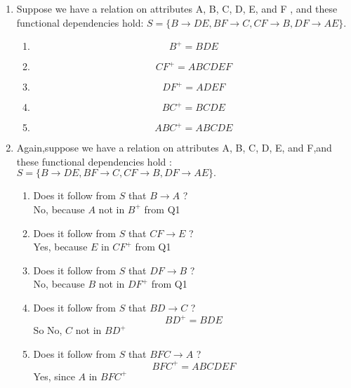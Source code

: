 \documentclass[11pt]{article}
\begin{document}
\begin{enumerate}
    \item Suppose we have a relation on attributes A, B, C, D, E, and F , and these functional dependencies hold: $S=\{B\to DE, BF \to C, CF \to B, DF \to AE\}$.
    \begin{solution}
        \begin{enumerate}
            \item 
            \[
                B^+ = BDE
            \]
            \item 
            \[
                CF^+ = ABCDEF
            \]
            \item 
            \[
                DF^+ = ADEF
            \]
            \item 
            \[
                BC^+ = BCDE
            \]
            \item 
            \[
                ABC^+ = ABCDE
            \]
        \end{enumerate}
    \end{solution}
    \item Again,suppose we have a relation on attributes A, B, C, D, E, and F,and these functional dependencies hold : $S = \{ B\to DE, BF \to C, CF\to B, DF\to AE \}.$
    \begin{solution}
        \begin{enumerate}
            \item Does it follow from $S$ that $B\to A$ ? \\
            No, because $A$ not in $B^+$ from Q1
            \item Does it follow from $S$ that $CF\to E$ ? \\ 
            Yes, because $E$ in $CF^+$ from Q1
            \item Does it follow from $S$ that $DF\to B$ ? \\
            No, because $B$ not in $DF^+$ from Q1
            \item Does it follow from $S$ that $BD\to C$ ? \\
            \[
                BD^+ = BDE
            \]
            So No, $C$ not in $BD^+$
            \item Does it follow from $S$ that $BFC\to A$ ? \\
            \[
                BFC^+ = ABCDEF
            \]
            Yes, since $A$ in $BFC^+$
        \end{enumerate}
    \end{solution}

\end{enumerate}
\end{document}
